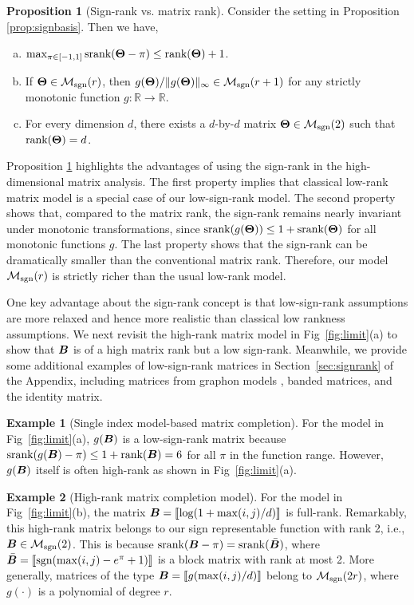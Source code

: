 \documentclass[aos]{imsart}
\theoremstyle{definition}
\newtheorem{proposition}{Proposition}
\newtheorem{example}{Example}
\def\sign{\textup{sgn}}
\def\srank{\textup{srank}}
\def\rank{\textup{rank}}
\def\caliM{\tM_{\textup{sgn}}}
\begin{document}
\begin{proposition}[Sign-rank vs. matrix rank]\label{prop:signrank} Consider the setting in Proposition \ref{prop:signbasis}. Then we have,
\begin{enumerate}[(a)]
\item $\max_{\pi\in[-1,1]}\srank(\mTheta-\pi)\leq \rank(\mTheta)+1$.
\item If $\mTheta \in \caliM(r)$, then $g(\mTheta)/\mnormSize{}{g(\mTheta)}\in\caliM(r+1)$ for any strictly monotonic function $g\colon \mathbb{R}\to\mathbb{R}$.
\item For every dimension $d$, there exists a $d$-by-$d$ matrix $\mTheta\in\caliM(2)$ such that $\rank(\mTheta)= d$.  
\end{enumerate}
\end{proposition}

\noindent
Proposition \ref{prop:signrank} highlights the advantages of using the sign-rank in the high-dimensional matrix analysis. The first property implies that classical low-rank matrix model is a special case of our low-sign-rank model. The second property shows that, compared to the matrix rank, the sign-rank remains nearly invariant under monotonic transformations, since $\srank(g(\mTheta)) \leq 1+\srank(\mTheta)$ for all monotonic functions $g$. The last property shows that the sign-rank can be dramatically smaller than the conventional matrix rank. Therefore, our model $\caliM(r)$ is strictly richer than the usual low-rank model. 

One key advantage about the sign-rank concept is that low-sign-rank assumptions are more relaxed and hence more realistic than classical low rankness assumptions. We next revisit the high-rank matrix model in Fig~\ref{fig:limit}(a) to show that $\bm B$ is of a high matrix rank but a low sign-rank. Meanwhile, we provide some additional examples of low-sign-rank matrices in Section~\ref{sec:signrank} of the Appendix, including matrices from graphon models \cite{chan2014consistent}, banded matrices, and the identity matrix.

\begin{example}[Single index model-based matrix completion]
For the model in Fig~\ref{fig:limit}(a), $g(\bm B)$ is a low-sign-rank matrix because $\srank(g(\mB)-\pi)\leq 1+\rank(\mB)=6$ for all $\pi$ in the function range. However, $g(\bm B)$ itself is often high-rank as shown in Fig~\ref{fig:limit}(a).
\end{example}

\begin{example}[High-rank matrix completion model]\label{ex:high-rank}
For the model in Fig~\ref{fig:limit}(b), the matrix $\bm B=\llbracket \log(1+\max(i,j)/d) \rrbracket$ is full-rank. Remarkably, this high-rank matrix belongs to our sign representable function with rank 2, i.e., $\mB\in \caliM(2)$. This is because $\srank(\mB-\pi)=\srank(\bar \mB)$, where $\bar \mB=\entry{\sign(\max(i,j)-e^\pi+1)}$ is a block matrix with rank at most 2. More generally, matrices of the type $\bm B=\llbracket g(\max(i,j)/d) \rrbracket$ belong to $\caliM(2r)$, where $g(\cdot)$ is a polynomial of degree $r$.
\end{example}
\end{document}
